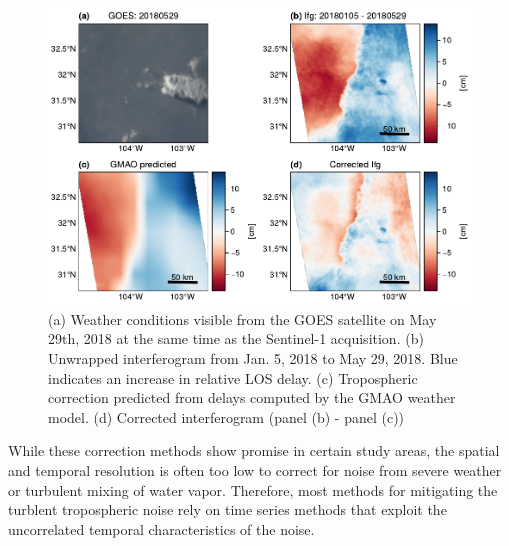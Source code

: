 \begin{figure}[!h]
	\centering
	\includegraphics[width=1.0\textwidth]{figures/chapter3-sar/figure_tropo_correct_wave.pdf}
	\caption[West Texas tropospheric correction attempt for pressure front]{
		(a) Weather conditions visible from the GOES satellite on May 29th, 2018 at the same time as the Sentinel-1 acquisition.
		(b) Unwrapped interferogram from Jan. 5, 2018 to May 29, 2018. Blue indicates an increase in relative LOS delay.
		(c) Tropospheric correction predicted from delays computed by the GMAO weather model.
		(d) Corrected interferogram (panel (b) - panel (c))
	}
	\label{fig:ch3-tropo-correct-wave}
\end{figure}

While these correction methods show promise in certain study areas, the spatial and temporal resolution is often too low to correct for noise from severe weather or turbulent mixing of water vapor. Therefore, most methods for mitigating the turblent tropospheric noise rely on time series methods that exploit the uncorrelated temporal characteristics of the noise.


%


